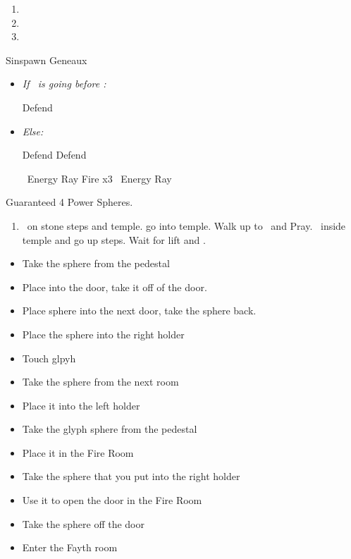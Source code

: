 \begin{enumerate}[resume]
    \item \sd
    \item \formation{\tidus}{\yuna}{\lulu}
    \item \save
\end{enumerate}
\bothvfill\winvfill\lossvfill
\begin{battle}[3000]{Sinspawn Geneaux}
    \begin{itemize}
        \item \textit{If \tidus\ is going before \yuna:}
              \begin{itemize}
                  \tidusf Defend
              \end{itemize}
        \item \textit{Else:}
              \begin{itemize}
                  \switch{\yuna}{\wakka}
                  \wakkaf Defend
                  \tidusf Defend
              \end{itemize}
        \summon{\valefor}
        \valeforf \od\ Energy Ray
        \valeforf Fire x3
        \valeforf \od\ Energy Ray
    \end{itemize}
Guaranteed 4 Power Spheres.
\end{battle}
\begin{enumerate}[resume]
    \item \sd\ on stone steps and temple. go into temple. Walk up to \wakka\ and Pray. \sd\ inside temple and go up steps. Wait for lift and \sd.
\end{enumerate}
\begin{trial}
    \begin{itemize}
        \item Take the sphere from the pedestal
        \item Place into the door, take it off of the door.
        \item Place sphere into the next door, take the sphere back.
        \item Place the sphere into the right holder
        \item Touch glpyh
        \item Take the sphere from the next room
        \item Place it into the left holder
        \item Take the glyph sphere from the pedestal
        \item Place it in the Fire Room
        \item Take the sphere that you put into the right holder
        \item Use it to open the door in the Fire Room
        \item Take the sphere off the door
        \item Enter the Fayth room
    \end{itemize}
\end{trial}
